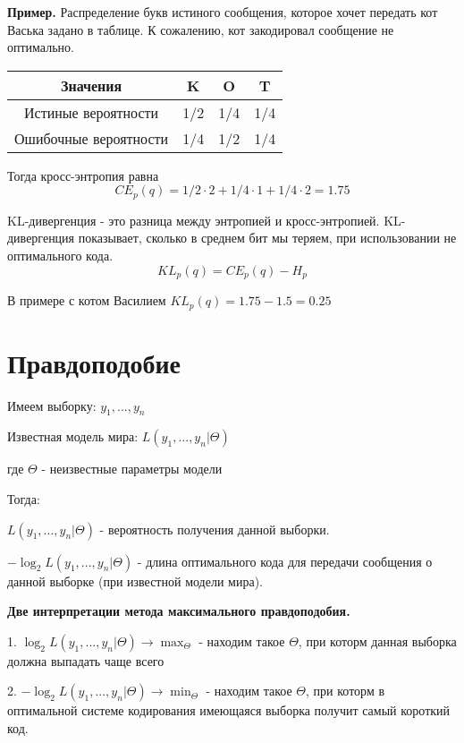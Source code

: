 \documentclass[12pt]{article} %
\theoremstyle{definition} %
\begin{document}
    \textbf{Пример.}
    Распределение букв истиного сообщения, которое хочет передать кот Васька задано в таблице. К сожалению, кот закодировал сообщение не оптимально.
    \begin{table}[!hbt]
		\begin{center}
		\label{tab:simParameters}
		\begin{tabular}{cccc}
			\hline
			Значения & K & O & T \\
			\hline
			Истиные вероятности & 1/2 & 1/4 & 1/4 \\
			\hline
			Ошибочные вероятности & 1/4 & 1/2 & 1/4 \\
			\hline
		\end{tabular}
		\end{center}
	\end{table}
    
    Тогда кросс-энтропия равна
    \[
    CE_p (q) = 1/2\cdot2 + 1/4\cdot1 + 1/4\cdot2 = 1.75
    \]
    
    KL-дивергенция - это разница между энтропией и кросс-энтропией. KL-дивергенция показывает, сколько в среднем бит мы теряем, при использовании не оптимального кода.
    \[
    KL_p (q) = CE_p (q) - H_p
    \]
    
    В примере с котом Василием $KL_p (q) = 1.75 - 1.5 = 0.25$

\section{Правдоподобие}
    Имеем выборку: $y_1,..., y_n$
    
    Известная модель мира: $L(y_1,..., y_n | \Theta)$
    
    где $\Theta$ - неизвестные параметры модели 
    
    Тогда: 
    
    $L(y_1,..., y_n | \Theta)$ - вероятность получения данной выборки. 
    
    $-\log_2 L(y_1,..., y_n | \Theta)$ - длина оптимального кода для передачи сообщения о данной выборке (при известной модели мира).
    
    \textbf{Две интерпретации метода максимального правдоподобия.} 
    
    1. $\log_2 L(y_1,..., y_n | \Theta) \rightarrow \max_\Theta $ - находим такое $\Theta$, при которм данная выборка должна выпадать чаще всего 
    
    2. $ -\log_2 L(y_1,..., y_n | \Theta) \rightarrow \min_\Theta $ - находим такое $\Theta$, при которм в оптимальной системе кодирования имеющаяся выборка получит самый короткий код.
    
\end{document}
